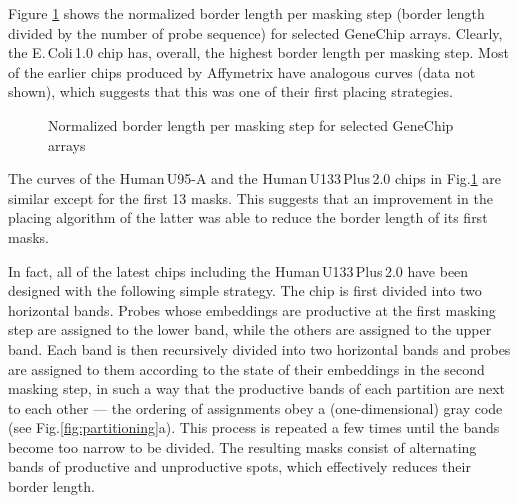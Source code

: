 \documentclass{llncs}
\begin{document}
Figure \ref{fig:border_length} shows the normalized border length per masking step (border length divided by the number of probe sequence) for selected GeneChip arrays. Clearly, the E.\,Coli\,1.0 chip has, overall, the highest border length per masking step. Most of the earlier chips produced by Affymetrix have analogous curves (data not shown), which suggests that this was one of their first placing strategies.

\begin{figure}
\begin{center}

\end{center}
\vspace*{-2ex}
\caption{Normalized border length per masking step for selected GeneChip arrays}
\label{fig:border_length}
\end{figure} 

The curves of the Human\,U95-A and the Human\,U133\,Plus\,2.0 chips in Fig.\ref{fig:border_length} are similar except for the first 13 masks. This suggests that an improvement in the placing algorithm of the latter was able to reduce the border length of its first masks.

In fact, all of the latest chips including the Human\,U133\,Plus\,2.0 have been designed with the following simple strategy. The chip is first divided into two horizontal bands. Probes whose embeddings are productive at the first masking step are assigned to the lower band, while the others are assigned to the upper band. Each band is then recursively divided into two horizontal bands and probes are assigned to them according to the state of their embeddings in the second masking step, in such a way that the productive bands of each partition are next to each other  --- the ordering of assignments obey a (one-dimensional) gray code (see Fig.\ref{fig:partitioning}a). This process is repeated a few times until the bands become too narrow to be divided. The resulting masks consist of alternating bands of productive and unproductive spots, which effectively reduces their border length.
\end{document}

